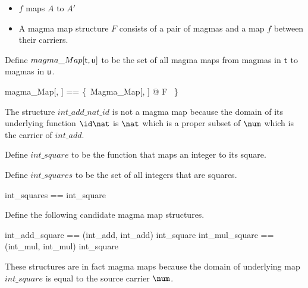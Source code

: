 \documentclass{amsart}
\begin{document}
\begin{itemize}
	\item $f$ maps $A$ to $A'$
	\item A magma map structure $F$ consists of a pair of magmas and a map $f$ between their carriers.
\end{itemize}

Define $magma\_Map[\mathsf{t}, \mathsf{u}]$ to be the set of all magma maps
from magmas in $\mathsf{t}$ to magmas in $\mathsf{u}$.

\begin{zed}
	magma\_Map[\genT, \genU] == \{~Magma\_Map[\genT, \genU] @ F ~\}
\end{zed}

\begin{counterexample}
The structure $int\_add\_nat\_id$ is not a magma map because the
domain of its underlying function $\id \nat$ is $\nat$ which is a proper subset of $\num$
which is the carrier of $int\_add$.


\end{counterexample}

\begin{example}
Define $int\_square$ to be the function that maps an integer to its square.


Define $int\_squares$ to be the set of all integers that are squares.

\begin{zed}
	int\_squares == \ran int\_square
\end{zed}

Define the following candidate magma map structures.

\begin{zed}
	int\_add\_square == (int\_add, int\_add) \mapsto int\_square
\also
	int\_mul\_square == (int\_mul, int\_mul) \mapsto int\_square
\end{zed}

These structures are in fact magma maps because the domain of underlying map $int\_square$
is equal to the source carrier $\num$.


\end{example}
\end{document}

